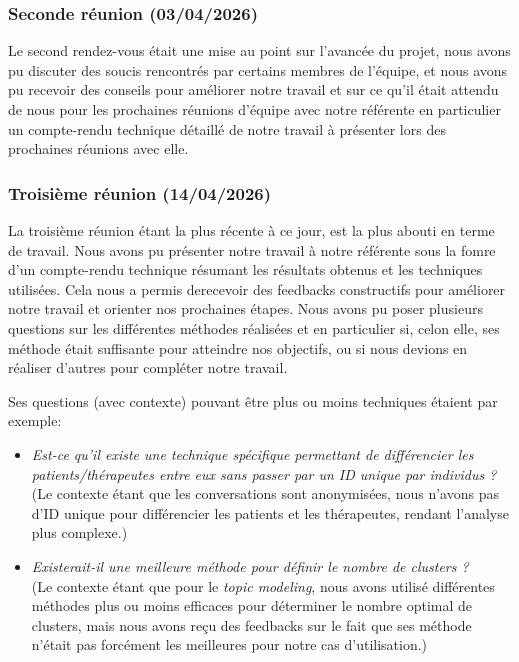 \documentclass[12pt,a4paper]{article}
\begin{document}
\subsubsection{Seconde réunion (03/04/2026)}\label{subsubsec:reuRef2}
Le second rendez-vous était une mise au point sur l'avancée du projet, nous avons pu discuter des soucis rencontrés par certains membres de l'équipe, 
et nous avons pu recevoir des conseils pour améliorer notre travail et sur ce qu'il était attendu de nous pour les prochaines réunions d'équipe avec notre référente
en particulier un compte-rendu technique détaillé de notre travail à présenter lors des prochaines réunions avec elle.

\subsubsection{Troisième réunion (14/04/2026)}\label{subsubsec:reuRef3}
La troisième réunion étant la plus récente à ce jour, est la plus abouti en terme de travail.
Nous avons pu présenter notre travail à notre référente sous la fomre d'un compte-rendu technique résumant les résultats obtenus et les techniques utilisées.
Cela nous a permis derecevoir des feedbacks constructifs pour améliorer notre travail et orienter nos prochaines étapes.
Nous avons pu poser plusieurs questions sur les différentes méthodes réalisées et en particulier si, celon elle, ses méthode était suffisante pour atteindre nos objectifs, 
ou si nous devions en réaliser d'autres pour compléter notre travail.\smallbreak

Ses questions (avec contexte) pouvant être plus ou moins techniques étaient par exemple:
\begin{itemize}
  \item \textit{Est-ce qu’il existe une technique spécifique permettant de différencier les patients/thérapeutes entre eux sans passer par un ID unique par individus ?}
                (Le contexte étant que les conversations sont anonymisées, nous n'avons pas d'ID unique pour différencier les patients et les thérapeutes,
                rendant l'analyse plus complexe.)
  \item \textit{Existerait-il une meilleure méthode pour définir le nombre de clusters ?}\\
                (Le contexte étant que pour le \textit{topic modeling}, nous avons utilisé différentes méthodes plus ou moins efficaces pour déterminer le nombre optimal de clusters, 
                mais nous avons reçu des feedbacks sur le fait que ses méthode n'était pas forcément les meilleures pour notre cas d'utilisation.)
\end{itemize}
\end{document}
